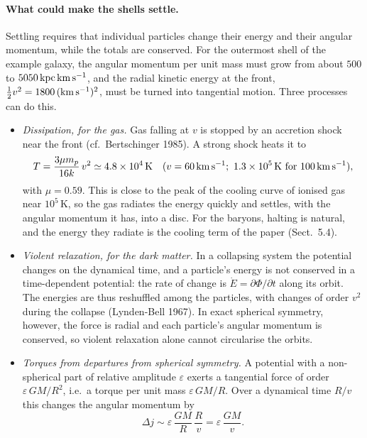 \documentclass[11pt,a4paper]{article}
\begin{document}
\paragraph{What could make the shells settle.} Settling requires that individual
particles change their energy and their angular momentum, while the totals are
conserved. For the outermost shell of the example galaxy, the angular momentum per
unit mass must grow from about $500$ to $5050\,{\rm kpc\,km\,s^{-1}}$, and the radial
kinetic energy at the front, $\tfrac12v^2=1800\,({\rm km\,s^{-1}})^2$, must be turned
into tangential motion. Three processes can do this.
\begin{itemize}
\item \emph{Dissipation, for the gas.} Gas falling at $v$ is stopped by an accretion
  shock near the front (cf.\ Bertschinger 1985). A strong shock heats it to
  \begin{equation*}
    T=\frac{3\mu m_p}{16k}\,v^2\simeq4.8\times10^4\,{\rm K}\quad
    (v=60\,{\rm km\,s^{-1}};\ 1.3\times10^5\,{\rm K}\ \text{for}\ 100\,{\rm km\,s^{-1}}),
  \end{equation*}
  with $\mu=0.59$. This is close to the peak of the cooling curve of ionised gas
  near $10^5$\,K, so the gas radiates the energy quickly and settles, with the
  angular momentum it has, into a disc. For the baryons, halting is natural, and the
  energy they radiate is the cooling term of the paper (Sect.~5.4).
\item \emph{Violent relaxation, for the dark matter.} In a collapsing system the
  potential changes on the dynamical time, and a particle's energy is not conserved
  in a time-dependent potential: the rate of change is $\dot E=\partial\Phi/\partial t$
  along its orbit. The energies are thus reshuffled among the particles, with
  changes of order $v^2$ during the collapse (Lynden-Bell 1967). In exact spherical
  symmetry, however, the force is radial and each particle's angular momentum is
  conserved, so violent relaxation alone cannot circularise the orbits.
\item \emph{Torques from departures from spherical symmetry.} A potential with a
  non-spherical part of relative amplitude $\varepsilon$ exerts a tangential force of
  order $\varepsilon\,GM/R^2$, i.e.\ a torque per unit mass $\varepsilon\,GM/R$. Over a
  dynamical time $R/v$ this changes the angular momentum by
  \begin{equation*}
    \Delta j\sim\varepsilon\,\frac{GM}{R}\,\frac{R}{v}=\varepsilon\,\frac{GM}{v}.

\end{equation*}
\end{itemize}
\end{document}

